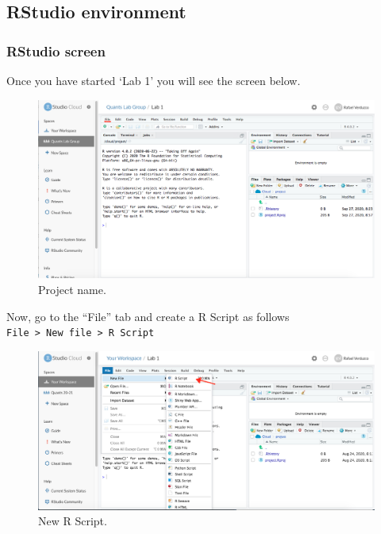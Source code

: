 \documentclass[
]{book}
\begin{document}
\hypertarget{rstudio-environment}{%
\subsection{RStudio environment}\label{rstudio-environment}}

\hypertarget{rstudio-screen}{%
\subsubsection{RStudio screen}\label{rstudio-screen}}

Once you have started `Lab 1' you will see the screen below.

\begin{figure}

\includegraphics[width=1\linewidth]{./images/rstudio_cloud_lab1_empty} \hfill{}

\caption{Project name.}\label{fig:unnamed-chunk-5}
\end{figure}

Now, go to the ``File'' tab and create a R Script as follows \texttt{File\ \textgreater{}\ New\ file\ \textgreater{}\ R\ Script}

\begin{figure}

\includegraphics[width=1\linewidth]{./images/rstudio_cloud_new_script} \hfill{}

\caption{New R Script.}\label{fig:unnamed-chunk-6}
\end{figure}
\end{document}
